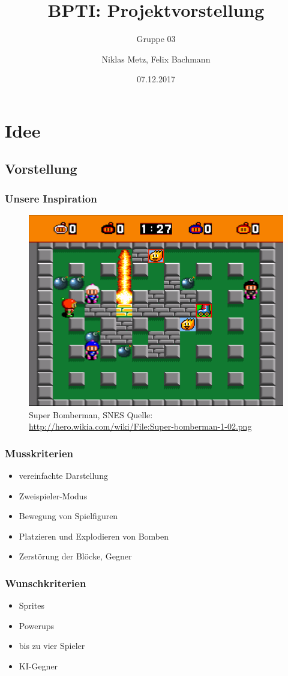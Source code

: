\documentclass[18pt]{beamer}
\title[BPTI]{BPTI: Projektvorstellung}
\subtitle{Gruppe 03}
\author{Niklas Metz, Felix Bachmann}
\date{07.12.2017}
\institute{}
\begin{document}

\begin{frame}
\titlepage
\end{frame}

\section{Idee}
	\subsection{Vorstellung}
		\begin{frame}
			\frametitle{Unsere Inspiration}
			\begin{figure}[H]
				\centering
				\includegraphics[scale=0.35]{../bomberman.png}
				\centering
				\caption*{Super Bomberman, SNES \newline Quelle: \url{http://hero.wikia.com/wiki/File:Super-bomberman-1-02.png} }
			\end{figure}
		\end{frame}
		\begin{frame}
			\frametitle{Musskriterien}
			\begin{itemize}
				\item vereinfachte Darstellung
				\item Zweispieler-Modus
				\item Bewegung von Spielfiguren
				\item Platzieren und Explodieren von Bomben
				\item Zerstörung der Blöcke, Gegner
			\end{itemize}
		\end{frame}
		\begin{frame}
			\frametitle{Wunschkriterien}
			\begin{itemize}
				\item Sprites
				\item Powerups
				\item bis zu vier Spieler
				\item KI-Gegner
			\end{itemize}
		\end{frame}
\end{document}
